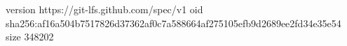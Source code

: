 version https://git-lfs.github.com/spec/v1
oid sha256:af16a504b7517826d37362af0c7a588664af275105efb9d2689ee2fd34e35e54
size 348202
